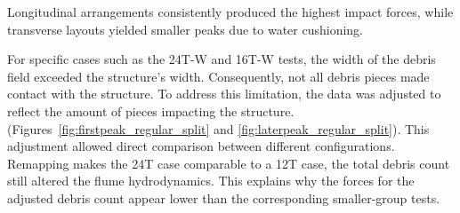 \documentclass{article}
\begin{document}
Longitudinal arrangements consistently produced the highest impact forces, while transverse layouts yielded smaller peaks due to water cushioning.

For specific cases such as the 24T-W and 16T-W tests, the width of the debris field exceeded the structure’s width. Consequently, not all debris pieces made contact with the structure. To address this limitation, the data was adjusted to reflect the amount of pieces impacting the structure.  (Figures~\ref{fig:firstpeak_regular_split} and \ref{fig:laterpeak_regular_split}). This adjustment allowed direct comparison between different configurations. Remapping makes the 24T case comparable to a 12T case, the total debris count still altered the flume hydrodynamics. This explains why the forces for the adjusted debris count appear lower than the corresponding
smaller-group tests. 
\end{document}
